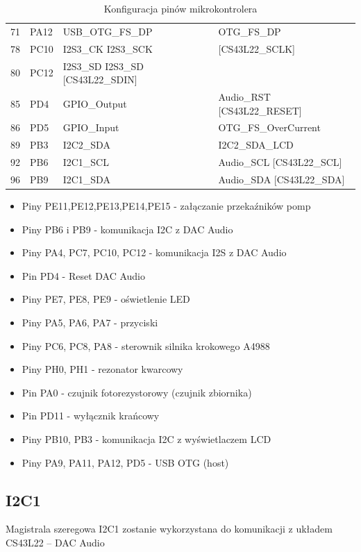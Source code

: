 \documentclass[10pt, a4paper]{article}
\begin{document}
\begin{table}[H]
\begin{tabular}{|l|l|l|l|}
71& PA12& USB{\_}OTG{\_}FS{\_}DP& OTG{\_}FS{\_}DP\\
78& PC10& I2S3{\_}CK I2S3{\_}SCK& [CS43L22{\_}SCLK]\\
80& PC12& I2S3{\_}SD I2S3{\_}SD [CS43L22{\_}SDIN]\\
85& PD4& GPIO{\_}Output& Audio{\_}RST [CS43L22{\_}RESET]\\
86& PD5& GPIO{\_}Input& OTG{\_}FS{\_}OverCurrent\\
89& PB3& I2C2{\_}SDA& I2C2{\_}SDA{\_}LCD\\
92& PB6& I2C1{\_}SCL& Audio{\_}SCL [CS43L22{\_}SCL]\\
96& PB9& I2C1{\_}SDA& Audio{\_}SDA [CS43L22{\_}SDA]\\

		\hline
	\end{tabular}
	\caption{Konfiguracja pinów mikrokontrolera}
	
\end{table}
\begin{itemize}
\item Piny PE11,PE12,PE13,PE14,PE15 - załączanie przekaźników pomp
\item Piny PB6 i PB9 - komunikacja I2C z DAC Audio
\item Piny PA4, PC7, PC10, PC12 - komunikacja I2S z DAC Audio
\item Pin PD4 - Reset DAC Audio
\item Piny PE7, PE8, PE9 - oświetlenie LED
\item Piny PA5, PA6, PA7 - przyciski
\item Piny PC6, PC8, PA8 - sterownik silnika krokowego A4988
\item Piny PH0, PH1 - rezonator kwarcowy
\item Pin PA0 - czujnik fotorezystorowy (czujnik zbiornika)
\item Pin PD11 - wyłącznik krańcowy
\item Piny PB10, PB3 - komunikacja I2C z wyświetlaczem LCD
\item Piny PA9, PA11, PA12, PD5 - USB OTG (host)
\end{itemize}



\subsection{I2C1}

Magistrala szeregowa I2C1 zostanie wykorzystana do komunikacji z układem CS43L22 -- DAC Audio
\end{document}
